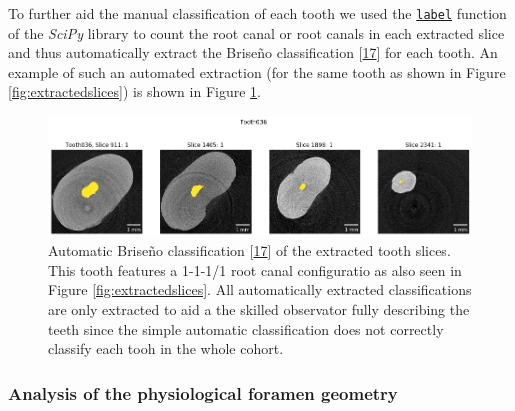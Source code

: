 \documentclass[
  american,
]{article}
\begin{document}
To further aid the manual classification of each tooth we used the \href{https://docs.scipy.org/doc/scipy/reference/generated/scipy.ndimage.label.html}{\texttt{label}} function of the \emph{SciPy} library to count the root canal or root canals in each extracted slice and thus automatically extract the Briseño classification {[}\protect\hyperlink{ref-ZTgDEakx}{17}{]} for each tooth.
An example of such an automated extraction (for the same tooth as shown in Figure \ref{fig:extractedslices}) is shown in Figure \ref{fig:briseno}.

\begin{figure}
\hypertarget{fig:briseno}{%
\centering
\includegraphics{images/Tooth036.Briseno.png}
\caption{Automatic Briseño classification {[}\protect\hyperlink{ref-ZTgDEakx}{17}{]} of the extracted tooth slices.
This tooth features a 1-1-1/1 root canal configuratio as also seen in Figure \ref{fig:extractedslices}.
All automatically extracted classifications are only extracted to aid a the skilled observator fully describing the teeth since the simple automatic classification does not correctly classify each tooh in the whole cohort.}\label{fig:briseno}
}
\end{figure}

\hypertarget{analysis-of-the-physiological-foramen-geometry}{%
\subsubsection{Analysis of the physiological foramen geometry}\label{analysis-of-the-physiological-foramen-geometry}}
\end{document}

